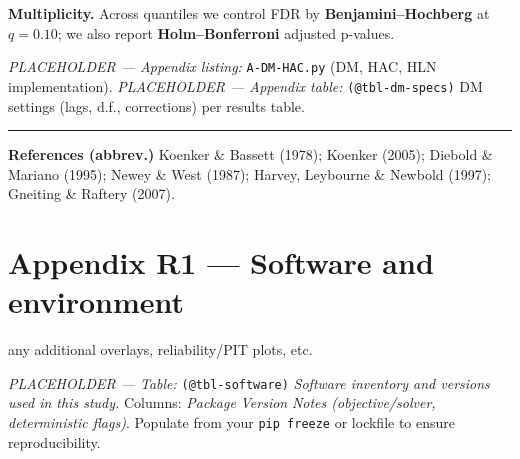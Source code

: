 \documentclass[
  a4paper,
  DIV=11,
  numbers=noendperiod]{scrreprt}
\begin{document}
\textbf{Multiplicity.} Across quantiles we control FDR by
\textbf{Benjamini--Hochberg} at \(q=0.10\); we also report
\textbf{Holm--Bonferroni} adjusted p-values.

\emph{PLACEHOLDER --- Appendix listing:} \texttt{A-DM-HAC.py} (DM, HAC,
HLN implementation). \emph{PLACEHOLDER --- Appendix table:}
\texttt{(@tbl-dm-specs)} DM settings (lags, d.f., corrections) per
results table.

\begin{center}\rule{0.5\linewidth}{0.5pt}\end{center}

\textbf{References (abbrev.)} Koenker \& Bassett (1978); Koenker (2005);
Diebold \& Mariano (1995); Newey \& West (1987); Harvey, Leybourne \&
Newbold (1997); Gneiting \& Raftery (2007).

\chapter{Appendix R1 --- Software and
environment}\label{app-r1-software}

any additional overlays, reliability/PIT plots, etc.

\emph{PLACEHOLDER --- Table:} \texttt{(@tbl-software)} \emph{Software
inventory and versions used in this study.} Columns: \emph{Package}
\textbar{} \emph{Version} \textbar{} \emph{Notes (objective/solver,
deterministic flags)}. Populate from your \texttt{pip\ freeze} or
lockfile to ensure reproducibility.
\end{document}
